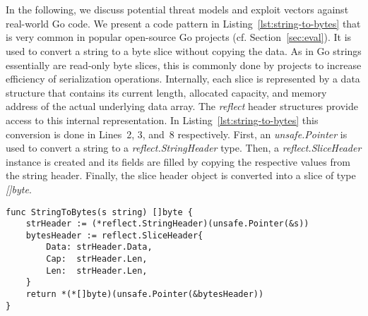 \section{}


\subsection{}

\label{sec:appr:vulnerabilites}

In the following, we discuss potential threat models and exploit vectors against real-world \unsafe{} Go code.
We present a code pattern in Listing~\ref{lst:string-to-bytes} that is very common in popular open-source Go projects (cf. Section~\ref{sec:eval}).
It is used to convert a string to a byte slice without copying the data.
As in Go strings essentially are read-only byte slices, this is commonly done by projects to increase efficiency of serialization operations. %
Internally, each slice is represented by a data structure that contains its current length, allocated capacity, and memory address of the actual underlying data array.
The \textit{reflect} header structures provide access to this internal representation.
In Listing~\ref{lst:string-to-bytes} this conversion is done in Lines~2, 3, and~8 respectively.
First, an \textit{unsafe.Pointer} is used to convert a string to a \textit{reflect.StringHeader} type.
Then, a \textit{reflect.SliceHeader} instance is created and its fields are filled by copying the respective values from the string header.
Finally, the slice header object is converted into a slice of type \textit{[]byte}.

\begin{lstlisting}[language=Golang, label=lst:string-to-bytes, caption=Conversion from string to bytes using \unsafe{}, float, belowskip=-1.5em, aboveskip=0em]
func StringToBytes(s string) []byte {
	strHeader := (*reflect.StringHeader)(unsafe.Pointer(&s))
	bytesHeader := reflect.SliceHeader{
		Data: strHeader.Data,
		Cap:  strHeader.Len,
		Len:  strHeader.Len,
	}
	return *(*[]byte)(unsafe.Pointer(&bytesHeader))
}
\end{lstlisting}



